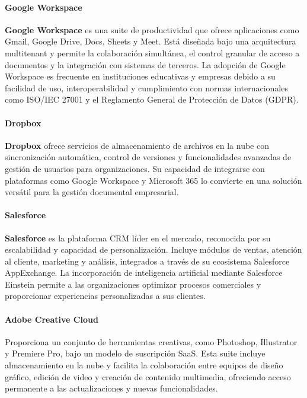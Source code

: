 {            \paragraph{Google Workspace} \textbf{Google Workspace} es una suite de productividad que ofrece aplicaciones como Gmail, Google Drive, Docs, Sheets y Meet. Está diseñada bajo una arquitectura multitenant y permite la colaboración simultánea, el control granular de acceso a documentos y la integración con sistemas de terceros. La adopción de Google Workspace es frecuente en instituciones educativas y empresas debido a su facilidad de uso, interoperabilidad y cumplimiento con normas internacionales como ISO/IEC 27001 y el Reglamento General de Protección de Datos (GDPR).
            
            \paragraph{Dropbox} \textbf{Dropbox} ofrece servicios de almacenamiento de archivos en la nube con sincronización automática, control de versiones y funcionalidades avanzadas de gestión de usuarios para organizaciones. Su capacidad de integrarse con plataformas como Google Workspace y Microsoft 365 lo convierte en una solución versátil para la gestión documental empresarial.
            
            \paragraph{Salesforce} \textbf{Salesforce} es la plataforma CRM líder en el mercado, reconocida por su escalabilidad y capacidad de personalización. Incluye módulos de ventas, atención al cliente, marketing y análisis, integrados a través de su ecosistema Salesforce AppExchange. La incorporación de inteligencia artificial mediante Salesforce Einstein permite a las organizaciones optimizar procesos comerciales y proporcionar experiencias personalizadas a sus clientes.
            
            \paragraph{Adobe Creative Cloud} Proporciona un conjunto de herramientas creativas, como Photoshop, Illustrator y Premiere Pro, bajo un modelo de suscripción SaaS. Esta suite incluye almacenamiento en la nube y facilita la colaboración entre equipos de diseño gráfico, edición de video y creación de contenido multimedia, ofreciendo acceso permanente a las actualizaciones y nuevas funcionalidades.
            
}
